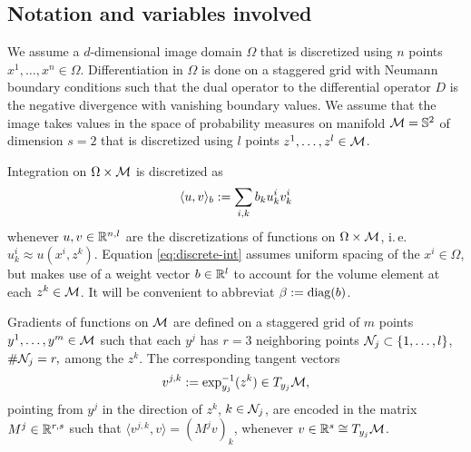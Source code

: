 
\subsection{Notation and variables involved}

We assume a $d$-dimensional image domain $\Omega$ that is discretized using
$n$ points $x^1, \dots, x^n \in \Omega$.
Differentiation in $\Omega$ is done on a staggered grid with Neumann boundary
conditions such that the dual operator to the differential operator $D$ is the
negative divergence with vanishing boundary values.
We assume that the image takes values in the space of
probability measures on manifold $\mathcal{M} = \mathbb{S}^2$ of dimension $s=2$ that is
discretized using $l$ points $z^1, \dots, z^l \in \mathcal{M}$.

Integration on $\Omega \times \mathcal{M}$ is discretized as
\begin{equation}\label{eq:discrete-int}
    \langle u, v \rangle_b := \sum_{i,k} b_{k} u_k^i v_k^i
    \vspace{-7.5pt}
\end{equation}
whenever $u,v \in \mathbb{R}^{n,l}$ are the discretizations of functions on
$\Omega \times \mathcal{M}$, i.\,e. $u_k^i \approx u(x^i,z^k)$.
Equation \eqref{eq:discrete-int} assumes uniform spacing of the $x^i \in \Omega$,
but makes use of a weight vector $b \in \mathbb{R}^l$ to account for the volume element
at each $z^k \in \mathcal{M}$.
It will be convenient to abbreviat $\beta := \operatorname{diag}(b)$.

Gradients of functions on $\mathcal{M}$ are defined on a staggered grid of $m$ points
$y^1, \dots, y^m \in \mathcal{M}$ such that each $y^j$ has $r=3$ neighboring points $
    \mathcal{N}_j \subset \{1, \dots, l\}$, $\#\mathcal{N}_j = r,
$ among the $z^k$.
The corresponding tangent vectors
\begin{equation}
    v^{j,k} := \exp^{-1}_{y_j}(z^k) \in T_{y_j}\mathcal{M},
\end{equation}
pointing from $y^j$ in the direction of $z^k$, $k \in \mathcal{N}_j$, are encoded in
the matrix $M^j \in \mathbb{R}^{r,s}$ such that $
    \langle v^{j,k}, v \rangle = (M^j v)_k
$, whenever $v \in \mathbb{R}^s \cong T_{y_j}\mathcal{M}$.

